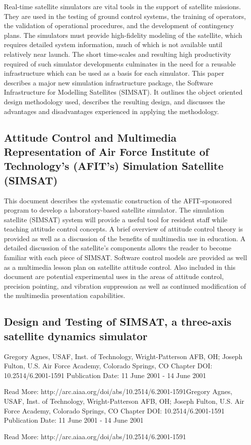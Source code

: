 Real-time satellite simulators are vital tools in the support of satellite missions. They are used in the testing of ground control systems, the training of operators, the validation of operational procedures, and the development of contingency plans. The simulators must provide high-fidelity modeling of the satellite, which requires detailed system information, much of which is not available until relatively near launch. The short time-scales and resulting high productivity required of such simulator developments culminates in the need for a reusable infrastructure which can be used as a basis for each simulator. This paper describes a major new simulation infrastructure package, the Software Infrastructure for Modelling Satellites (SIMSAT). It outlines the object oriented design methodology used, describes the resulting design, and discusses the advantages and disadvantages experienced in applying the methodology.


\subsection{Attitude Control and Multimedia Representation of Air Force Institute of Technology's (AFIT's) Simulation Satellite (SIMSAT)}

This document describes the systematic construction of the AFIT-sponsored program to develop a laboratory-based satellite simulator. The simulation satellite (SIMSAT) system will provide a useful tool for resident staff while teaching attitude control concepts. A brief overview of attitude control theory is provided as well as a discussion of the benefits of multimedia use in education. A detailed discussion of the satellite's components allows the reader to become familiar with each piece of SIMSAT. Software control models are provided as well as a multimedia lesson plan on satellite attitude control. Also included in this document are potential experimental uses in the areas of attitude control, precision pointing, and vibration suppression as well as continued modification of the multimedia presentation capabilities.

\subsection{Design and Testing of SIMSAT, a three-axis satellite dynamics simulator}

Gregory Agnes, USAF, Inst. of Technology, Wright-Patterson AFB, OH; Joseph Fulton, U.S. Air Force Academy, Colorado Springs, CO
Chapter DOI: 10.2514/6.2001-1591
Publication Date: 11 June 2001 - 14 June 2001


Read More: http://arc.aiaa.org/doi/abs/10.2514/6.2001-1591Gregory Agnes, USAF, Inst. of Technology, Wright-Patterson AFB, OH; Joseph Fulton, U.S. Air Force Academy, Colorado Springs, CO
Chapter DOI: 10.2514/6.2001-1591
Publication Date: 11 June 2001 - 14 June 2001

Read More: http://arc.aiaa.org/doi/abs/10.2514/6.2001-1591

